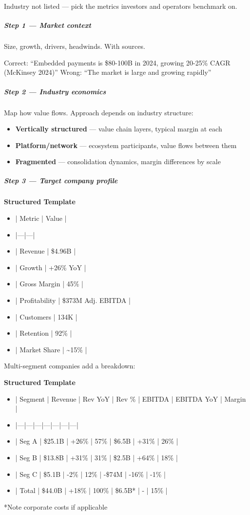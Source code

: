 \documentclass[11pt]{article}
\begin{document}
Industry not listed — pick the metrics investors and operators benchmark on.


\subparagraph{Step 1 — Market context}\mbox{}\par

Size, growth, drivers, headwinds. With sources.


Correct: ``Embedded payments is \$80-100B in 2024, growing 20-25\% CAGR (McKinsey 2024)'' Wrong: ``The market is large and growing rapidly''


\subparagraph{Step 2 — Industry economics}\mbox{}\par

Map how value flows. Approach depends on industry structure:

\begin{itemize}[leftmargin=*,itemsep=2pt,topsep=2pt]
\item {} \textbf{Vertically structured} — value chain layers, typical margin at each
\item {} \textbf{Platform/network} — ecosystem participants, value flows between them
\item {} \textbf{Fragmented} — consolidation dynamics, margin differences by scale
\end{itemize}

\subparagraph{Step 3 — Target company profile}\mbox{}\par

\textbf{Structured Template}
\begin{itemize}[leftmargin=*,itemsep=2pt,topsep=2pt]
\item {} | Metric | Value |
\item {} |---|---|
\item {} | Revenue | \$4.96B |
\item {} | Growth | +26\% YoY |
\item {} | Gross Margin | 45\% |
\item {} | Profitability | \$373M Adj. EBITDA |
\item {} | Customers | 134K |
\item {} | Retention | 92\% |
\item {} | Market Share | \textasciitilde{}15\% |
\end{itemize}

Multi-segment companies add a breakdown:


\textbf{Structured Template}
\begin{itemize}[leftmargin=*,itemsep=2pt,topsep=2pt]
\item {} | Segment | Revenue | Rev YoY | Rev \% | EBITDA | EBITDA YoY | Margin |
\item {} |---|---|---|---|---|---|---|
\item {} | Seg A | \$25.1B | +26\% | 57\% | \$6.5B | +31\% | 26\% |
\item {} | Seg B | \$13.8B | +31\% | 31\% | \$2.5B | +64\% | 18\% |
\item {} | Seg C | \$5.1B | -2\% | 12\% | -\$74M | -16\% | -1\% |
\item {} | Total | \$44.0B | +18\% | 100\% | \$6.5B* | - | 15\% |
\end{itemize}
*Note corporate costs if applicable
\end{document}
